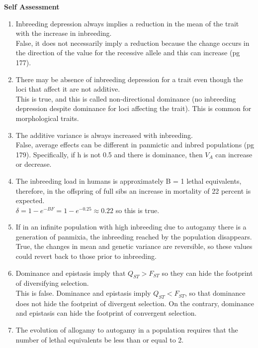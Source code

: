 \documentclass[12pt]{amsart}
\begin{document}
{\large \bf Self Assessment}
\begin{enumerate}
\item Inbreeding depression always implies a reduction in the mean of the trait with the increase in inbreeding.\\
False, it does not necessarily imply a reduction because the change occurs in the direction of the value for the recessive allele and this can increase (pg 177).\\
\item There may be absence of inbreeding depression for a trait even though the loci that affect it are not additive.\\
This is true, and this is called non-directional dominance (no inbreeding depression despite dominance for loci affecting the trait). This is common for morphological traits.\\
\item The additive variance is always increased with inbreeding.\\
False, average effects can be different in panmictic and inbred populations (pg 179). Specifically, if h is not 0.5 and there is dominance, then $V_A$ can increase or decrease.\\
\item The inbreeding load in humans is approximately B = 1 lethal equivalents, therefore, in the offspring of full sibs an increase in mortality of 22 percent is expected.\\
$\delta = 1 - e^{-BF} = 1 - e^{-0.25} \approx 0.22$ so this is true. \\
\item If in an infinite population with high inbreeding due to autogamy there is a generation of panmixia, the inbreeding reached by the population disappears.\\
True, the changes in mean and genetic variance are reversible, so these values could revert back to those prior to inbreeding.\\
\item Dominance and epistasis imply that $Q_{ST} > F_{ST}$ so they can hide the footprint of diversifying selection.\\
This is false. Dominance and epistasis imply $Q_{ST} < F_{ST}$, so that dominance does not hide the footprint of divergent selection. On the contrary, dominance and epistasis can hide the footprint of convergent selection.\\
\item The evolution of allogamy to autogamy in a population requires that the number of lethal equivalents be less than or equal to 2.\\

\end{enumerate}
\end{document}
